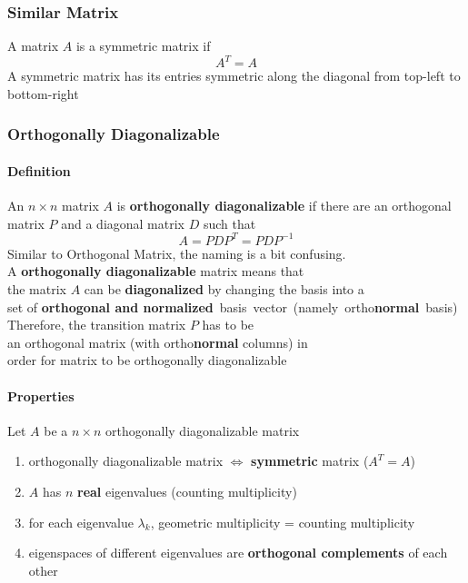 \documentclass[11pt]{article}
\newcommand{\mymat}[1]{#1}
\begin{document}
    \subsubsection{Similar Matrix}
    A matrix $\mymat{A}$ is a symmetric matrix if 
    \begin{equation}
        \mymat{A}^T = \mymat{A}
    \end{equation}
    A symmetric matrix has its entries symmetric along the diagonal from top-left to bottom-right

    \newpage
    \subsubsection{Orthogonally Diagonalizable} \label{sec3_5_6}
    \paragraph{Definition} An $n \times n$ matrix $\mymat{A}$ is \textbf{orthogonally diagonalizable} if there are an orthogonal matrix $\mymat{P}$ and a diagonal matrix $\mymat{D}$ such that
    \begin{equation}
        \mymat{A} = \mymat{P}\mymat{D}\mymat{P}^{T} = \mymat{P}\mymat{D}\mymat{P}^{-1}
    \end{equation}
    Similar to Orthogonal Matrix, the naming is a bit confusing. \\
    A \textbf{orthogonally diagonalizable} matrix means that \\
    \quad the matrix $\mymat{A}$ can be \textbf{diagonalized} by changing the basis into a \\
    \quad set of \textbf{orthogonal and normalized}~basis~vector~(namely~ortho\textbf{normal}~basis)
    Therefore, the transition matrix $\mymat{P}$ has to be \\
    \quad an orthogonal matrix (with ortho\textbf{normal} columns) in \\
    \quad order for matrix to be orthogonally diagonalizable

    \paragraph{Properties} Let $\mymat{A}$ be a $n \times n$ orthogonally diagonalizable matrix
    \begin{enumerate}
        \item orthogonally diagonalizable matrix $\iff$ \textbf{symmetric} matrix ($\mymat{A}^T = \mymat{A}$)
        \item $\mymat{A}$ has $n$ \textbf{real} eigenvalues (counting multiplicity)
        \item for each eigenvalue $\lambda_k$, geometric multiplicity = counting multiplicity
        \item eigenspaces of different eigenvalues are \textbf{orthogonal complements} of each other
    \end{enumerate}
\end{document}
